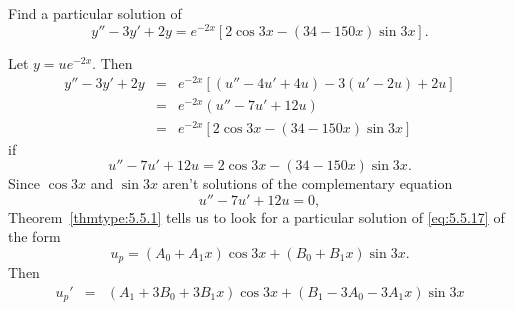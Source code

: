 \documentclass{ximera}
\begin{document}
\begin{example}\label{example:5.5.5}
Find a particular solution of
\begin{equation} \label{eq:5.5.16}
y''-3y'+2y=e^{-2x}\left[2\cos 3x-(34-150x)\sin 3x\right].
\end{equation}


\begin{explanation}
Let $y=ue^{-2x}$. Then
\begin{eqnarray*}
y''-3y'+2y&=&e^{-2x}\left[(u''-4u'+4u)-3(u'-2u)+2u\right]\\
&=&e^{-2x}(u''-7u'+12u)\\ &=&
e^{-2x}\left[2\cos 3x-(34-150x)\sin 3x\right]
\end{eqnarray*}
if
 \begin{equation} \label{eq:5.5.17}
u''-7u'+12u=2\cos 3x-(34-150x)\sin 3x.
\end{equation}
Since $\cos3x$ and $\sin3x$ aren't solutions of
the complementary equation
$$
u''-7u'+12u=0,
$$
 Theorem~\ref{thmtype:5.5.1} tells us to look for a particular solution
of \eqref{eq:5.5.17} of the form
\begin{equation} \label{eq:5.5.18}
u_p=(A_0+A_1x)\cos 3x +(B_0+B_1x)\sin 3x.
\end{equation}
Then
\begin{eqnarray*}
u_p'&=&(A_1+3B_0+3B_1x)\cos 3x+(B_1-3A_0-3A_1x)\sin 3x\\


\end{eqnarray*}
\end{explanation}
\end{example}
\end{document}
